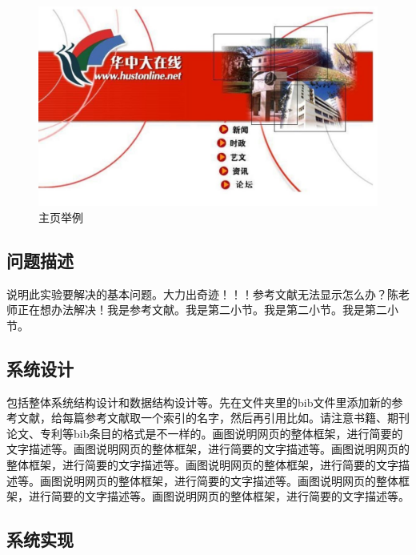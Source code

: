 \documentclass[supercite]{Experimental_Report}
\theoremstyle{definition}
\begin{document}
\begin{figure}[htb]
	\begin{center}
		\includegraphics[scale=0.40]{images/2-1.jpg}
		\caption{主页举例}
		\label{fig55-1}
	\end{center}
\end{figure}

\subsection{问题描述}

说明此实验要解决的基本问题。大力出奇迹！！！参考文献无法显示怎么办？陈老师正在想办法解决\cite{STR2021Neurocom, AVS2021Neurocom}！我是参考文献。我是第二小节\cite{Mehrabian1974An}。我是第二小节\cite{Rezaei2014CVPR}。我是第二小节\cite{Ramnath2008IJCV}。

\subsection{系统设计}

包括整体系统结构设计和数据结构设计等。先在文件夹里的bib文件里添加新的参考文献，给每篇参考文献取一个索引的名字，然后再引用比如\cite{STR2021Neurocom}\cite{AVS2021Neurocom, Rezaei2014CVPR}。请注意书籍、期刊论文、专利等bib条目的格式是不一样的。画图说明网页的整体框架，进行简要的文字描述等。画图说明网页的整体框架，进行简要的文字描述等。画图说明网页的整体框架，进行简要的文字描述等。画图说明网页的整体框架，进行简要的文字描述等。画图说明网页的整体框架，进行简要的文字描述等。画图说明网页的整体框架，进行简要的文字描述等。画图说明网页的整体框架，进行简要的文字描述等。

\subsection{系统实现}
\end{document}
